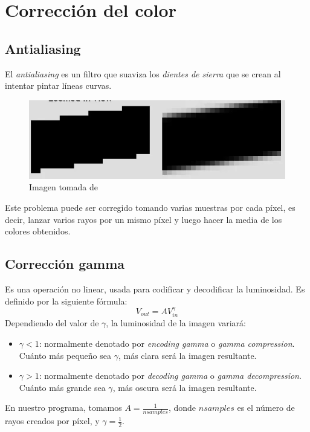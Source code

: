 \documentclass[12pt]{article}
\theoremstyle{definition}
\theoremstyle{remark}
\begin{document}
\section{Corrección del color}

\subsection{Antialiasing}

El \textit{antialiasing} es un filtro que suaviza los \textit{dientes de sierra} que se crean al intentar pintar líneas curvas. 

\begin{figure}[H]
   \center
  \includegraphics[scale=0.6]{antialiasing.png}
  \caption{Imagen tomada de \cite{antialiasing}}
\end{figure}

Este problema puede ser corregido tomando varias muestras por cada píxel, es decir, lanzar varios rayos por un mismo píxel y luego hacer la media de los colores obtenidos.

\subsection{Corrección gamma}

Es una operación no linear, usada para codificar y decodificar la luminosidad. Es definido por la siguiente fórmula:
\[
V_{out}=AV_{in}^\gamma
\]
Dependiendo del valor de $\gamma$, la luminosidad de la imagen variará:
\begin{itemize}
\item $\gamma < 1$: normalmente denotado por \textit{encoding gamma} o \textit{gamma compression}. Cuánto más pequeño sea $\gamma$, más clara será la imagen resultante.
\item $\gamma > 1$: normalmente denotado por \textit{decoding gamma} o \textit{gamma decompression}. Cuánto más grande sea $\gamma$, más oscura será la imagen resultante.
\end{itemize}

En nuestro programa, tomamos $A=\frac{1}{nsamples}$, donde $nsamples$ es el número de rayos creados por píxel, y $\gamma=\frac{1}{2}$.
\end{document}
